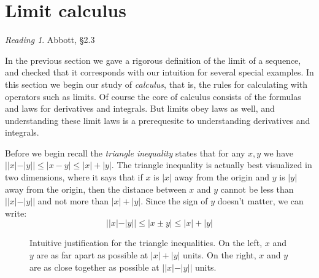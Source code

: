 \documentclass[11pt,oneside]{amsbook}
\theoremstyle{definition}
\theoremstyle{plain}
\theoremstyle{definition}
\theoremstyle{remark}
\newtheorem*{reading}{Reading}
\numberwithin{equation}{section}
\numberwithin{figure}{section}
\begin{document}
\newpage
\section{Limit calculus}

\begin{reading}
  Abbott, \S 2.3
\end{reading}

In the previous section we gave a rigorous definition of the limit of a sequence, and checked that it corresponds with our intuition for several special examples. In this section we begin our study of \emph{calculus}, that is, the rules for calculating with operators such as limits. Of course the core of calculus consists of the formulas and laws for derivatives and integrals. But limits obey laws as well, and understanding these limit laws is a prerequesite to understanding derivatives and integrals.

Before we begin recall the \emph{triangle inequality} states that for any $x,y$ we have $||x|-|y||\leq|x-y|\leq|x|+|y|$. The triangle inequality is actually best visualized in two dimensions, where it says that if $x$ is $|x|$ away from the origin and $y$ is $|y|$ away from the origin, then the distance between $x$ and $y$ cannot be less than $||x|-|y||$ and not more than $|x|+|y|$. Since the sign of $y$ doesn't matter, we can write:
\[||x|-|y||\leq|x\pm y|\leq|x|+|y|
\]

\begin{figure}[h]
  \centering
  \quad
  \caption{Intuitive justification for the triangle inequalities. On the left, $x$ and $y$ are as far apart as possible at $|x|+|y|$ units. On the right, $x$ and $y$ are as close together as possible at $||x|-|y||$ units.}
\end{figure}
\end{document}
